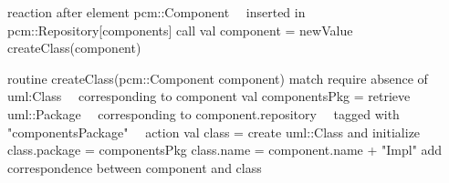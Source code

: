 reaction {
   after element pcm::Component ~\label{lst:line:trigger}~inserted in pcm::Repository[components]
   call {
      val component = newValue
      createClass(component)
   }
}

routine createClass(pcm::Component component) {
   match {
      require absence of uml:Class~\label{lst:line:absence}~
         corresponding to component
      val componentsPkg = retrieve uml::Package~\label{lst:line:retrievestatement}~
         corresponding to component.repository~\label{lst:line:retrievetype}~
         tagged with "componentsPackage"~\label{lst:line:retrievetag}~
   }
   action {
      val class = create uml::Class and initialize {~\label{lst:line:createassignment}~
         class.package = componentsPkg
         class.name = component.name + "Impl"
      }
      add correspondence between component and class~\label{lst:line:createcorrespondence}~
   }
}